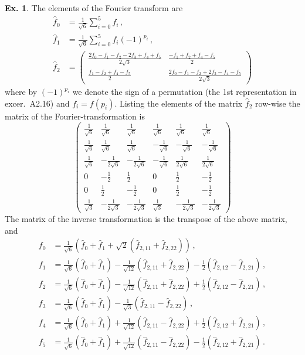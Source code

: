 \documentclass[a4paper,12pt]{article}
\theoremstyle{definition}
\newtheorem{exercise}{Ex.}[section]
\begin{document}
\begin{exercise}
 The elements of the Fourier transform are
 \[
  \begin{aligned}
  \hat{f}_0 &= \frac{1}{\sqrt{6}}\sum_{i=0}^5 f_i\,,\\
  \hat{f}_1 &= \frac{1}{\sqrt{6}}\sum_{i=0}^5 f_i (-1)^{p_i}\,,\\
  \hat{f}_2 &= \begin{pmatrix} \frac{2f_0-f_1-f_2-2f_3+f_4+f_5}{2\sqrt{3}} & \frac{-f_1+f_2+f_4-f_5}{2} \\ \frac{f_1-f_2+f_4-f_5}{2} & \frac{2f_0-f_1-f_2+2f_3-f_4-f_5}{2\sqrt{3}} \end{pmatrix}
  \end{aligned}
 \]
 where by $(-1)^{p_i}$ we denote the sign of a permutation (the 1st representation in excer.\ A2.16) and $f_i = f(p_i)$. Listing the elements of the matrix $\hat{f}_2$ row-wise the matrix of the Fourier-transformation is
 \[
  \begin{pmatrix}
   \frac{1}{\sqrt{6}} & \frac{1}{\sqrt{6}} & \frac{1}{\sqrt{6}} & \frac{1}{\sqrt{6}} & \frac{1}{\sqrt{6}} & \frac{1}{\sqrt{6}} \\
   \frac{1}{\sqrt{6}} & \frac{1}{\sqrt{6}} & \frac{1}{\sqrt{6}} & -\frac{1}{\sqrt{6}} & -\frac{1}{\sqrt{6}} & -\frac{1}{\sqrt{6}} \\
   \frac{1}{\sqrt{6}} & -\frac{1}{2\sqrt{6}} & -\frac{1}{2\sqrt{6}} & -\frac{1}{\sqrt{6}} & \frac{1}{2\sqrt{6}} & \frac{1}{2\sqrt{6}} \\
   0 & -\frac{1}{2} & \frac{1}{2} &  0 & \frac{1}{2} &  -\frac{1}{2} \\
   0 & \frac{1}{2} & -\frac{1}{2} & 0 & \frac{1}{2} & -\frac{1}{2}\\
   \frac{1}{\sqrt{3}} & -\frac{1}{2\sqrt{3}} & -\frac{1}{2\sqrt{3}} & \frac{1}{\sqrt{3}} & -\frac{1}{2\sqrt{3}} & -\frac{1}{2\sqrt{3}} 
  \end{pmatrix}
 \]
 The matrix of the inverse transformation is the transpose of the above matrix, and
 \[
  \begin{aligned}
   f_0 &= \frac{1}{\sqrt{6}}(\hat{f}_0 + \hat{f}_1 +\sqrt{2}(\hat{f}_{2,11} + \hat{f}_{2,22}))\,,\\
   f_1 &= \frac{1}{\sqrt{6}}(\hat{f}_0 + \hat{f}_1) - \frac{1}{\sqrt{12}}(\hat{f}_{2,11}+\hat{f}_{2,22}) -\frac{1}{2}(\hat{f}_{2,12}-\hat{f}_{2,21})\,,\\
   f_2 &= \frac{1}{\sqrt{6}}(\hat{f}_0 + \hat{f}_1) - \frac{1}{\sqrt{12}}(\hat{f}_{2,11}+\hat{f}_{2,22}) +\frac{1}{2}(\hat{f}_{2,12}-\hat{f}_{2,21})\,,\\
   f_3 &= \frac{1}{\sqrt{6}}(\hat{f}_0 + \hat{f}_1) - \frac{1}{\sqrt{3}}(\hat{f}_{2,11}-\hat{f}_{2,22})\,,\\
   f_4 &= \frac{1}{\sqrt{6}}(\hat{f}_0 + \hat{f}_1) +\frac{1}{\sqrt{12}}(\hat{f}_{2,11}-\hat{f}_{2,22}) + \frac{1}{2}(\hat{f}_{2,12}+\hat{f}_{2,21})\,,\\
   f_5 &= \frac{1}{\sqrt{6}}(\hat{f}_0 + \hat{f}_1) +\frac{1}{\sqrt{12}}(\hat{f}_{2,11}-\hat{f}_{2,22}) - \frac{1}{2}(\hat{f}_{2,12}+\hat{f}_{2,21})\,.
  \end{aligned}
 \]
\end{exercise}
\end{document}
